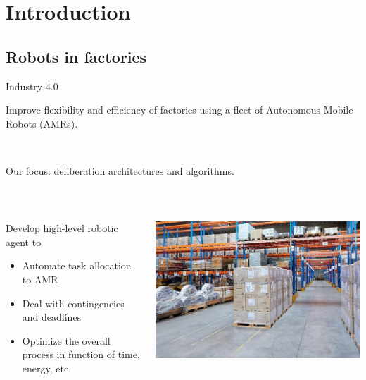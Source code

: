 \section{Introduction}
\subsection{Robots in factories}

\begin{frame}{Industry 4.0}
    \centering

    Improve flexibility and efficiency of factories using a fleet of Autonomous Mobile Robots (AMRs).

    ~~

    \pause

    Our focus: deliberation architectures and algorithms.

    ~~
\begin{columns}
    \begin{column}{0.6\textwidth}
        \pause
        Develop high-level robotic agent to
        \begin{itemize}
            \pause
            \item Automate task allocation to AMR
            \pause
            \item Deal with contingencies and deadlines
            \pause
            \item Optimize the overall process in function of time, energy, etc.
        \end{itemize}
    \end{column}
    \begin{column}{0.4\textwidth}
        \includegraphics[width = \textwidth]{images/logisticsolutions.jpg}
    \end{column}
\end{columns}
\end{frame}

